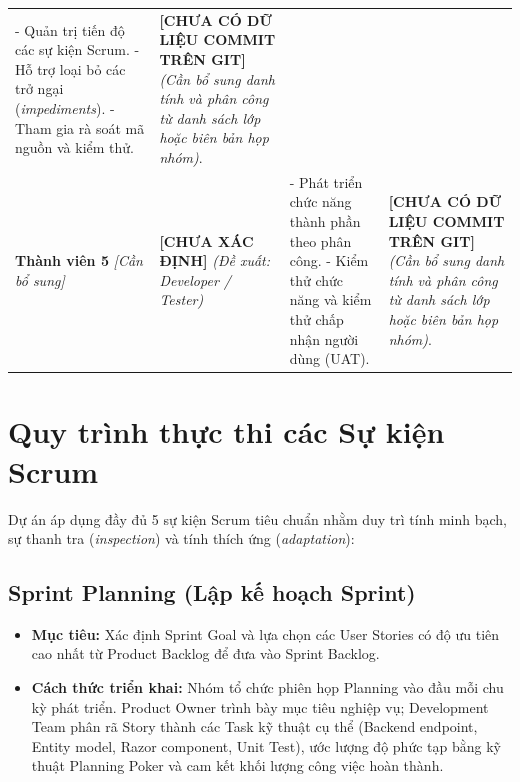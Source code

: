 \begin{table}[htbp]
\begin{tabularx}{\textwidth}{p{3.2cm} p{2.8cm} X X}
- Quản trị tiến độ các sự kiện Scrum.\newline
- Hỗ trợ loại bỏ các trở ngại (\textit{impediments}).\newline
- Tham gia rà soát mã nguồn và kiểm thử. &
\textbf{[CHƯA CÓ DỮ LIỆU COMMIT TRÊN GIT]}\newline
\textit{(Cần bổ sung danh tính và phân công từ danh sách lớp hoặc biên bản họp nhóm)}. \\
\addlinespace
\textbf{Thành viên 5} \newline \textit{[Cần bổ sung]} & \textbf{[CHƯA XÁC ĐỊNH]} \newline \textit{(Đề xuất: Developer / Tester)} &
- Phát triển chức năng thành phần theo phân công.\newline
- Kiểm thử chức năng và kiểm thử chấp nhận người dùng (UAT). &
\textbf{[CHƯA CÓ DỮ LIỆU COMMIT TRÊN GIT]}\newline
\textit{(Cần bổ sung danh tính và phân công từ danh sách lớp hoặc biên bản họp nhóm)}. \\
\bottomrule
\end{tabularx}
\end{table}

\section{Quy trình thực thi các Sự kiện Scrum}
\label{sec:su-kien-scrum}

Dự án áp dụng đầy đủ 5 sự kiện Scrum tiêu chuẩn \cite{scrumguide2020} nhằm duy trì tính minh bạch, sự thanh tra (\textit{inspection}) và tính thích ứng (\textit{adaptation}):

\subsection{Sprint Planning (Lập kế hoạch Sprint)}
\begin{itemize}
    \item \textbf{Mục tiêu:} Xác định Sprint Goal và lựa chọn các User Stories có độ ưu tiên cao nhất từ Product Backlog để đưa vào Sprint Backlog.
    \item \textbf{Cách thức triển khai:} Nhóm tổ chức phiên họp Planning vào đầu mỗi chu kỳ phát triển. Product Owner trình bày mục tiêu nghiệp vụ; Development Team phân rã Story thành các Task kỹ thuật cụ thể (Backend endpoint, Entity model, Razor component, Unit Test), ước lượng độ phức tạp bằng kỹ thuật Planning Poker và cam kết khối lượng công việc hoàn thành.
\end{itemize}

